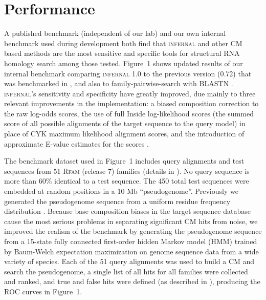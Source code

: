 \section{Performance}

A published benchmark (independent of our lab) \citep{Freyhult07} and
our own internal benchmark used during development
\citep{NawrockiEddy07} both find that \textsc{infernal} and other CM
based methods are the most sensitive and specific tools for structural
RNA homology search among those tested. Figure~1 shows updated results
of our internal benchmark comparing \textsc{infernal} 1.0 to the
previous version (0.72) that was benchmarked in \citet{Freyhult07},
and also to family-pairwise-search with BLASTN
\citep{Altschul97,Grundy98b}.  \textsc{infernal}'s sensitivity and
specificity have greatly improved, due mainly to three relevant
improvements in the implementation: a biased composition correction to
the raw log-odds scores, the use of full Inside log-likelihood scores
(the summed score of all possible alignments of the target sequence to
the query model) in place of CYK maximum likelihood alignment scores,
and the introduction of approximate E-value estimates for the scores
\citep{infguide03}.

The benchmark dataset used in Figure~1 includes query alignments and
test sequences from 51 \textsc{Rfam} (release 7) families (details in
\citep{NawrockiEddy07}).  No query sequence is more than 60\% identical
to a test sequence.  The 450 total test sequences were embedded at
random positions in a 10 Mb ``pseudogenome''.  Previously we generated
the pseudogenome sequence from a uniform residue frequency
distribution \citep{NawrockiEddy07}.  Because base composition biases
in the target sequence database cause the most serious problems in
separating significant CM hits from noise, we improved the realism of
the benchmark by generating the pseudogenome sequence from a 15-state
fully connected first-order hidden Markov model (HMM) trained by
Baum-Welch expectation maximization \citep{Durbin98} on genome
sequence data from a wide variety of species.  Each of the 51 query
alignments was used to build a CM and search the pseudogenome, a
single list of all hits for all families were collected and ranked,
and true and false hits were defined (as described in
\citet{NawrockiEddy07}), producing the ROC curves in Figure~1.

